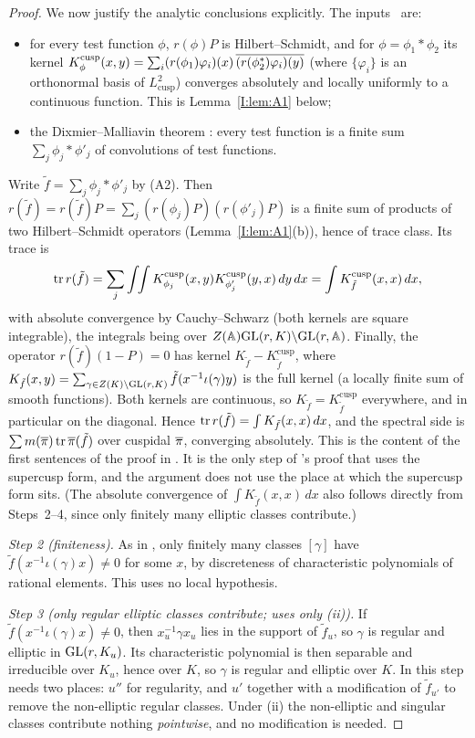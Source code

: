 \begin{proof}
We now justify the analytic conclusions explicitly. The inputs \Ev\ are:
\begin{itemize}
\item[(A1)] for every test function $\phi$, $r(\phi)P$ is Hilbert--Schmidt, and for $\phi=\phi_1*\phi_2$ its kernel $K^{\mathrm{cusp}}_\phi(x,y)=\sum_i(r(\phi_1)\varphi_i)(x)\,\overline{(r(\phi_2^*)\varphi_i)(y)}$ (where $\{\varphi_i\}$ is an orthonormal basis of $L^2_{\mathrm{cusp}}$) converges absolutely and locally uniformly to a continuous function. This is Lemma~\ref{I:lem:A1} below;
\item[(A2)] the Dixmier--Malliavin theorem \cite{DM78}: every test function is a finite sum $\sum_j\phi_j*\phi'_j$ of convolutions of test functions.
\end{itemize}
Write $\tilde f=\sum_j\phi_j*\phi'_j$ by (A2). Then $r(\tilde f)=r(\tilde f)P=\sum_j(r(\phi_j)P)(r(\phi'_j)P)$ is a finite sum of products of two Hilbert--Schmidt operators (Lemma~\ref{I:lem:A1}(b)), hence of trace class. Its trace is
\[ \operatorname{tr} r(\tilde f)=\sum_j\int\!\!\int K^{\mathrm{cusp}}_{\phi_j}(x,y)K^{\mathrm{cusp}}_{\phi'_j}(y,x)\,dy\,dx=\int K^{\mathrm{cusp}}_{\tilde f}(x,x)\,dx, \]
with absolute convergence by Cauchy--Schwarz (both kernels are square integrable), the integrals being over $Z(\mathbb{A})\mathrm{GL}(r,K)\backslash\mathrm{GL}(r,\mathbb{A})$. Finally, the operator $r(\tilde f)(1-P)=0$ has kernel $K_{\tilde f}-K^{\mathrm{cusp}}_{\tilde f}$, where $K_{\tilde f}(x,y)=\sum_{\gamma\in Z(K)\backslash\mathrm{GL}(r,K)}\tilde f(x^{-1}\iota(\gamma)y)$ is the full kernel (a locally finite sum of smooth functions). Both kernels are continuous, so $K_{\tilde f}=K^{\mathrm{cusp}}_{\tilde f}$ everywhere, and in particular on the diagonal. Hence $\operatorname{tr} r(\tilde f)=\int K_{\tilde f}(x,x)\,dx$, and the spectral side is $\sum m(\overline{\pi})\operatorname{tr}\overline{\pi}(\tilde f)$ over cuspidal $\overline{\pi}$, converging absolutely. This is the content of the first sentences of the proof in \cite[\S18]{FK86}. It is the only step of \cite{FK86}'s proof that uses the supercusp form, and the argument does not use the place at which the supercusp form sits. (The absolute convergence of $\int K_{\tilde f}(x,x)\,dx$ also follows directly from Steps~2--4, since only finitely many elliptic classes contribute.)

\emph{Step 2 (finiteness).} As in \cite[\S18]{FK86}, only finitely many classes $[\gamma]$ have $\tilde f(x^{-1}\iota(\gamma)x)\neq0$ for some $x$, by discreteness of characteristic polynomials of rational elements. This uses no local hypothesis.

\emph{Step 3 (only regular elliptic classes contribute; uses only (ii)).} If $\tilde f(x^{-1}\iota(\gamma)x)\ne0$, then $x_u^{-1}\gamma x_u$ lies in the support of $\tilde f_u$, so $\gamma$ is regular and elliptic in $\mathrm{GL}(r,K_u)$. Its characteristic polynomial is then separable and irreducible over $K_u$, hence over $K$, so $\gamma$ is regular and elliptic over $K$. In \cite{FK86} this step needs two places: $u''$ for regularity, and $u'$ together with a modification of $\tilde f_{u'}$ to remove the non-elliptic regular classes. Under (ii) the non-elliptic and singular classes contribute nothing \emph{pointwise}, and no modification is needed.


\end{proof}
